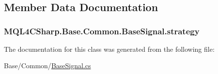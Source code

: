 \subsection{Member Data Documentation}
\subsubsection[{\texorpdfstring{strategy}{strategy}}]{ M\+Q\+L4\+C\+Sharp.\+Base.\+Common.\+Base\+Signal.\+strategy}\hypertarget{class_m_q_l4_c_sharp_1_1_base_1_1_common_1_1_base_signal_adc5fd0efe0218a05bd5b0fb84c0d3814}{}\label{class_m_q_l4_c_sharp_1_1_base_1_1_common_1_1_base_signal_adc5fd0efe0218a05bd5b0fb84c0d3814}


The documentation for this class was generated from the following file\+:\begin{DoxyCompactItemize}
\item 
Base/\+Common/\hyperlink{_base_signal_8cs}{Base\+Signal.\+cs}\end{DoxyCompactItemize}

